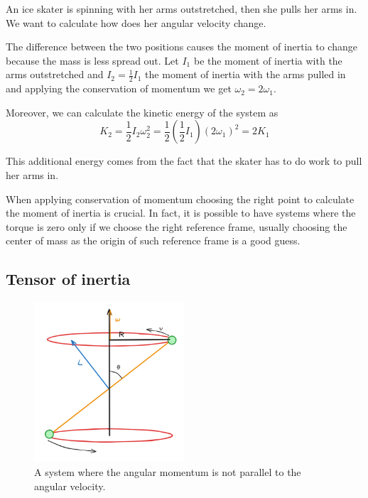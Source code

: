 \documentclass[12pt]{extarticle}
\begin{document}
\begin{example}
    An ice skater is spinning with her arms outstretched, then she pulls her arms in.
    We want to calculate how does her angular velocity change.

    The difference between the two positions causes the moment of inertia to change because the mass is less spread out.
    Let $I_1$ be the moment of inertia with the arms outstretched and $I_2 = \frac{1}{2} I_1$ the moment of inertia with the arms pulled in and applying the conservation of momentum we get $\omega_2 = 2 \omega_1$.

    Moreover, we can calculate the kinetic energy of the system as
    \begin{equation}
        K_2 = \frac{1}{2} I_2 \omega_2^2 = \frac{1}{2} \left(\frac{1}{2} I_1\right) (2 \omega_1)^2 = 2 K_1
    \end{equation}

    This additional energy comes from the fact that the skater has to do work to pull her arms in.
\end{example}

When applying conservation of momentum choosing the right point to calculate the moment of inertia is crucial.
In fact, it is possible to have systems where the torque is zero only if we choose the right reference frame, usually choosing the center of mass as the origin of such reference frame is a good guess.


\subsection{Tensor of inertia}

\begin{figure}[H]
    \centering
    \includegraphics[width=0.5\textwidth]{assets/S2_P2_PHY1/skew.png}
    \caption{A system where the angular momentum is not parallel to the angular velocity.}
    \label{fig:tensor-of-inertia}
\end{figure}
\end{document}
